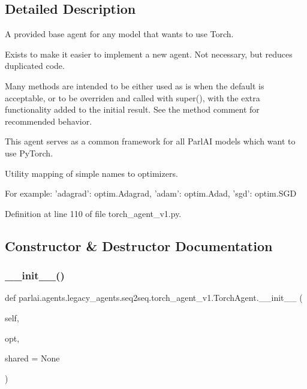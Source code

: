 \subsection{Detailed Description}
\begin{DoxyVerb}A provided base agent for any model that wants to use Torch.

Exists to make it easier to implement a new agent.
Not necessary, but reduces duplicated code.

Many methods are intended to be either used as is when the default is
acceptable, or to be overriden and called with super(), with the extra
functionality added to the initial result. See the method comment for
recommended behavior.

This agent serves as a common framework for all ParlAI models which want
to use PyTorch.
\end{DoxyVerb}
\begin{DoxyVerb}Utility mapping of simple names to optimizers.

For example:
'adagrad': optim.Adagrad, 'adam': optim.Adad, 'sgd': optim.SGD
\end{DoxyVerb}
 

Definition at line 110 of file torch\+\_\+agent\+\_\+v1.\+py.



\subsection{Constructor \& Destructor Documentation}
\mbox{\label{classparlai_1_1agents_1_1legacy__agents_1_1seq2seq_1_1torch__agent__v1_1_1TorchAgent_a1c4eb91757ee23e75edfa957d05db338}} 
\subsubsection{\texorpdfstring{\+\_\+\+\_\+init\+\_\+\+\_\+()}{\_\_init\_\_()}}
{\footnotesize\ttfamily def parlai.\+agents.\+legacy\+\_\+agents.\+seq2seq.\+torch\+\_\+agent\+\_\+v1.\+Torch\+Agent.\+\_\+\+\_\+init\+\_\+\+\_\+ (\begin{DoxyParamCaption}\item[{}]{self,  }\item[{}]{opt,  }\item[{}]{shared = {\ttfamily None} }\end{DoxyParamCaption})}

